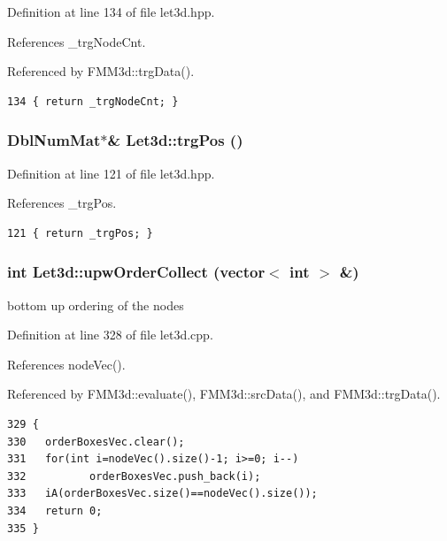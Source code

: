 Definition at line 134 of file let3d.hpp.

References \_\-trg\-Node\-Cnt.

Referenced by FMM3d::trg\-Data().

\footnotesize\begin{verbatim}134 { return _trgNodeCnt; }
\end{verbatim}\normalsize 


\subsubsection{\setlength{\rightskip}{0pt plus 5cm}Dbl\-Num\-Mat$\ast$\& Let3d::trg\-Pos ()\hspace{0.3cm}{\tt  [inline]}}\label{classLet3d_7dc770563c182703b1986abb06c6dbbd_7dc770563c182703b1986abb06c6dbbd}




Definition at line 121 of file let3d.hpp.

References \_\-trg\-Pos.

\footnotesize\begin{verbatim}121 { return _trgPos; }
\end{verbatim}\normalsize 


\subsubsection{\setlength{\rightskip}{0pt plus 5cm}int Let3d::upw\-Order\-Collect (vector$<$ int $>$ \&)}\label{classLet3d_1382847d0f42ddbbb82aef15511dc135_1382847d0f42ddbbb82aef15511dc135}


bottom up ordering of the nodes 

Definition at line 328 of file let3d.cpp.

References node\-Vec().

Referenced by FMM3d::evaluate(), FMM3d::src\-Data(), and FMM3d::trg\-Data().

\footnotesize\begin{verbatim}329 {
330   orderBoxesVec.clear();
331   for(int i=nodeVec().size()-1; i>=0; i--)
332          orderBoxesVec.push_back(i);
333   iA(orderBoxesVec.size()==nodeVec().size());
334   return 0;
335 }
\end{verbatim}\normalsize 





